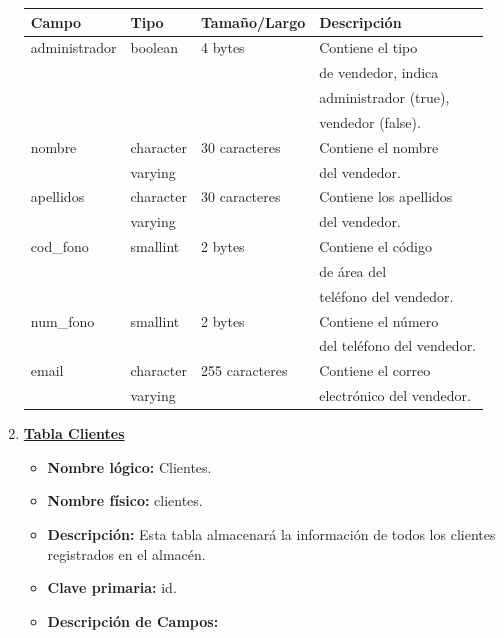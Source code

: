 \documentclass[letterpaper,12pt]{article}
\begin{document}
\begin{enumerate}
\newpage
\begin{table}[!ht]
\begin{center}
\begin{tabular}{|l|l|l|l|}
\hline
\textbf{Campo} \hspace*{2cm} & \textbf{Tipo} & \textbf{Tamaño/Largo} & \textbf{Descripción} \hspace*{3,5cm} \\
\hline

administrador & boolean & 4 bytes & Contiene el tipo\\
\mbox{} & \mbox{} & & de vendedor, indica\\
\mbox{} & \mbox{} & & administrador (true), \\
\mbox{} & \mbox{} & & vendedor (false). \\
\hline
nombre & character & 30 caracteres & Contiene el nombre\\
\mbox{} & varying & & del vendedor. \\

\hline
apellidos & character & 30 caracteres & Contiene los apellidos\\
\mbox{} & varying & & del vendedor. \\
\hline

cod\_fono & smallint & 2 bytes & Contiene el código\\
\mbox{} & \mbox{} & & de área del\\
\mbox{} & \mbox{} & & teléfono del vendedor.\\
\hline
num\_fono & smallint & 2 bytes & Contiene el número\\
\mbox{} & \mbox{} & & del teléfono del vendedor.\\
\hline
email & character & 255 caracteres & Contiene el correo\\
\mbox{} & varying & & electrónico del vendedor.\\
\hline

\end{tabular}
\end{center}
\end{table}

\newpage

\item \textbf{\underline{Tabla Clientes}}
\begin{itemize}
\item \textbf{Nombre lógico:} Clientes.
\item \textbf{Nombre físico:} clientes.
\item \textbf{Descripción:} Esta tabla almacenará la información de todos los clientes registrados en el almacén.
\item \textbf{Clave primaria:} id.
\item \textbf{Descripción de Campos:}
\end{itemize}


\end{enumerate}
\end{document}
